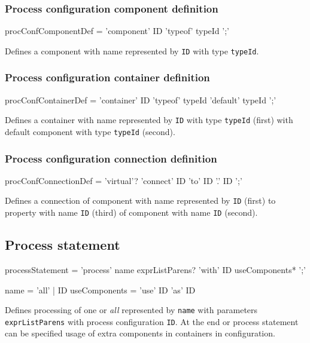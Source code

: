 \subsubsection{Process configuration component definition}
\begin{Grammar}
procConfComponentDef = 'component' ID 'typeof' typeId ';'
\end{Grammar}

Defines a component with name represented by \texttt{ID} with type \texttt{typeId}.


\subsubsection{Process configuration container definition}
\begin{Grammar}
procConfContainerDef =
	'container' ID 'typeof' typeId 'default' typeId ';'
\end{Grammar}

Defines a container with name represented by \texttt{ID} with type \texttt{typeId} (first) with default component with type \texttt{typeId} (second).


\subsubsection{Process configuration connection definition}
\begin{Grammar}
procConfConnectionDef = 'virtual'? 'connect' ID 'to' ID '.' ID ';'
\end{Grammar}

Defines a connection of component with name represented by \texttt{ID} (first) to property with name \texttt{ID} (third) of component with name \texttt{ID} (second).


\subsection{Process statement}
\begin{Grammar}
processStatement = 'process' name exprListParens?
	'with' ID useComponents* ';'

name = 'all' | ID
useComponents = 'use' ID 'as' ID
\end{Grammar}

Defines processing of one or \emph{all} \lsystems represented by \texttt{name} with parameters \texttt{exprListParens} with process configuration \texttt{ID}.
At the end or process statement can be specified usage of extra components in containers in configuration.



